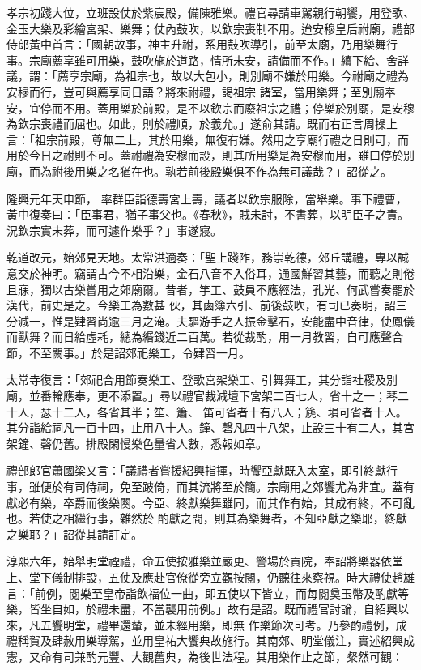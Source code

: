 \begin{pinyinscope}
 孝宗初踐大位，立班設仗於紫宸殿，備陳雅樂。禮官尋請車駕親行朝饗，用登歌、金玉大樂及彩繪宮架、樂舞；仗內鼓吹，以欽宗喪制不用。迨安穆皇后祔廟，禮部侍郎黃中首言：「國朝故事，神主升祔，系用鼓吹導引，前至太廟，乃用樂舞行事。宗廟薦享雖可用樂，鼓吹施於道路，情所未安，請備而不作。」續下給、舍詳議，謂：「薦享宗廟，為祖宗也，故以大包小，則別廟不嫌於用樂。今祔廟之禮為安穆而行，豈可與薦享同日語？將來祔禮，謁祖宗
 諸室，當用樂舞；至別廟奉安，宜停而不用。蓋用樂於前殿，是不以欽宗而廢祖宗之禮；停樂於別廟，是安穆為欽宗喪禮而屈也。如此，則於禮順，於義允。」遂俞其請。既而右正言周操上言：「祖宗前殿，尊無二上，其於用樂，無復有嫌。然用之享廟行禮之日則可，而用於今日之祔則不可。蓋祔禮為安穆而設，則其所用樂是為安穆而用，雖曰停於別廟，而為祔後用樂之名猶在也。孰若前後殿樂俱不作為無可議哉？」詔從之。



 隆興元年天申節，
 率群臣詣德壽宮上壽，議者以欽宗服除，當舉樂。事下禮曹，黃中復奏曰：「臣事君，猶子事父也。《春秋》，賊未討，不書葬，以明臣子之責。況欽宗實未葬，而可遽作樂乎？」事遂寢。



 乾道改元，始郊見天地。太常洪適奏：「聖上踐阼，務崇乾德，郊丘講禮，專以誠意交於神明。竊謂古今不相沿樂，金石八音不入俗耳，通國鮮習其藝，而聽之則倦且寐，獨以古樂嘗用之郊廟爾。昔者，竽工、鼓員不應經法，孔光、何武嘗奏罷於漢代，前史是之。今樂工為數甚
 伙，其鹵簿六引、前後鼓吹，有司已奏明，詔三分減一，惟是肄習尚逾三月之淹。夫驅游手之人振金擊石，安能盡中音律，使鳳儀而獸舞？而日給虛耗，總為緡錢近二百萬。若從裁酌，用一月教習，自可應聲合節，不至闕事。」於是詔郊祀樂工，令肄習一月。



 太常寺復言：「郊祀合用節奏樂工、登歌宮架樂工、引舞舞工，其分詣社稷及別廟，並番輪應奉，更不添置。」尋以禮官裁減壇下宮架二百七人，省十之一；琴二十人，瑟十二人，各省其半；笙、簫、
 笛可省者十有八人；篪、塤可省者十人。其分詣給祠凡一百十四，止用八十人。鐘、磬凡四十八架，止設三十有二人，其宮架鐘、磬仍舊。排殿閑慢樂色量省人數，悉報如章。



 禮部郎官蕭國梁又言：「議禮者嘗援紹興指揮，時饗亞獻既入太室，即引終獻行事，雖便於有司侍祠，免至跛倚，而其流將至於簡。宗廟用之郊饗尤為非宜。蓋有獻必有樂，卒爵而後樂闋。今亞、終獻樂舞雖同，而其作有始，其成有終，不可亂也。若使之相繼行事，雜然於
 酌獻之間，則其為樂舞者，不知亞獻之樂耶，終獻之樂耶？」詔從其請訂定。



 淳熙六年，始舉明堂禋禮，命五使按雅樂並嚴更、警場於貢院，奉詔將樂器依堂上、堂下儀制排設，五使及應赴官僚從旁立觀按閱，仍聽往來察視。時大禮使趙雄言：「前例，閱樂至皇帝詣飲福位一曲，即五使以下皆立，而每閱奠玉幣及酌獻等樂，皆坐自如，於禮未盡，不當襲用前例。」故有是詔。既而禮官討論，自紹興以來，凡五饗明堂，禮畢還輦，並未經用樂，即無
 作樂節次可考。乃參酌禮例，成禮稱賀及肆赦用樂導駕，並用皇祐大饗典故施行。其南郊、明堂儀注，實述紹興成憲，又命有司兼酌元豐、大觀舊典，為後世法程。其用樂作止之節，粲然可觀：




\end{pinyinscope}
